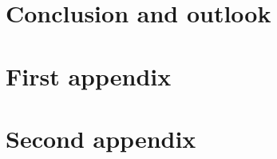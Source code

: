 \documentclass[a4paper, 11pt]{report}
\begin{document}
\chapter*{Conclusion and outlook}





\appendix


\chapter{First appendix}

\chapter{Second appendix}
\end{document}
